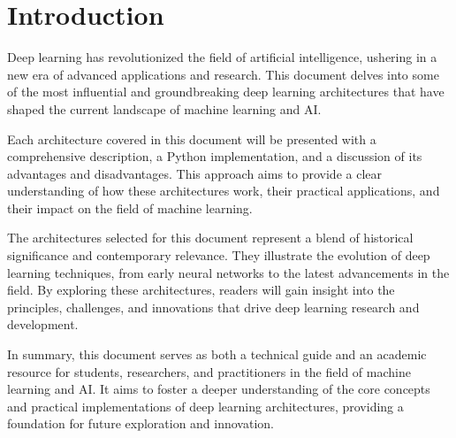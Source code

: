 \chapter{Introduction}

Deep learning has revolutionized the field of artificial intelligence, ushering in a new era of advanced applications and research. This document delves into some of the most influential and groundbreaking deep learning architectures that have shaped the current landscape of machine learning and AI.

Each architecture covered in this document will be presented with a comprehensive description, a Python implementation, and a discussion of its advantages and disadvantages. This approach aims to provide a clear understanding of how these architectures work, their practical applications, and their impact on the field of machine learning.

The architectures selected for this document represent a blend of historical significance and contemporary relevance. They illustrate the evolution of deep learning techniques, from early neural networks to the latest advancements in the field. By exploring these architectures, readers will gain insight into the principles, challenges, and innovations that drive deep learning research and development.

In summary, this document serves as both a technical guide and an academic resource for students, researchers, and practitioners in the field of machine learning and AI. It aims to foster a deeper understanding of the core concepts and practical implementations of deep learning architectures, providing a foundation for future exploration and innovation.
